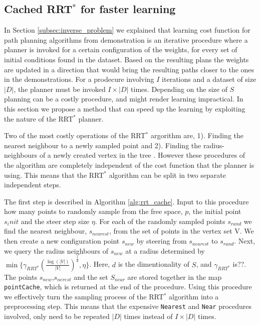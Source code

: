 \documentclass{article}  %
\begin{document}
\subsection{Cached RRT$^*$ for faster learning \label{subsec:cached}}
	In Section \ref{subsec:inverse_problem} we explained that learning cost function for path planning algorithms from demonstration is an iterative procedure where a planner is invoked for a certain configuration of the weights, for every set of initial conditions found in the dataset. Based on the resulting plans the weights are updated in a direction that would bring the resulting paths closer to the ones in the demonstrations. For a prodecure involving $I$ iterations and a dataset of size $|D|$, the planner must be invoked $I\times|D|$ times. Depending on the size of $S$ planning can be a costly procedure, and might render learning impractical. In this section we propose a method that can speed up the learning by exploiting the nature of the RRT$^*$ planner.

	Two of the most costly operations of the RRT$^*$ argorithm are, 1). Finding the nearest neighbour to a newly sampled point and 2). Finding the radius-neighbours of a newly created vertex in the tree \cite{karaman2011sampling}. However these procedures of the algorithm are completely independent of the cost function that the planner is using. This means that the RRT$^*$ algorithm can be split in two separate independent steps. 

	The first step is described in Algorithm \ref{alg:rrt_cache}. Input to this procedure how many points to randomly sample from the free space, $p$, the initial point $s_init$ and the steer step size $\eta$. For each of the randomly sampled points $s_{rand}$ we find the nearest neighbour, $s_{nearest}$, from the set of points in the vertex set V. We then create a new configuration point $s_{new}$ by steering from $s_{nearest}$ to $s_{rand}$. Next, we query the radius neighbours of $s_{new}$ at a radius determined by  $\min\{\gamma_{RRT^*}(\frac{\log(|V|)}{|V|})^{\frac{1}{d}},\eta\}$. Here, $d$ is the dimentionality of $S$, and $\gamma_{RRT^*}$ is??. The points $s_{new}$,$s_{nerest}$ and the set $S_{near}$ are stored together in the map \texttt{pointCache}, which is returned at the end of the procedure. Using this procedure we effectively turn the sampling process of the RRT$^*$ algorithm into a preprocessing step. This means that the expensive \texttt{Nearest} and \texttt{Near} procedures involved, only need to be repeated $|D|$ times instead of $I\times|D|$ times.
\end{document}
